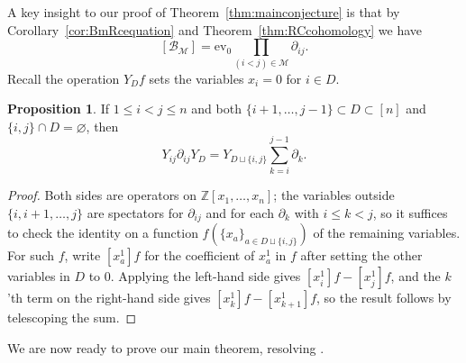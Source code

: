 \documentclass[11pt]{amsart}
\renewcommand{\emptyset}{\varnothing}
\theoremstyle{definition}
\newtheorem{prop}[thm]{Proposition}
\numberwithin{equation}{section}
\newcommand{\ct}{\operatorname{ev_0}} %
\begin{document}
A key insight to our proof of Theorem~\ref{thm:mainconjecture} is that by Corollary~\ref{cor:BmRcequation} and Theorem~\ref{thm:RCcohomology}
we have
\begin{equation}
\label{eqn:BMispartijprod}
[\mathcal{B}_\mathcal{M}]=\ct\prod_{(i<j)\in \mathcal{M}}\partial_{ij}.
\end{equation}
Recall the operation $Y_Df$ sets the variables $x_i=0$ for $i\in D$.
\begin{prop}
\label{prop:YdelY}
If $1\le i<j\le n$ and both $\{i+1,\ldots,j-1\}\subset D\subset [n]$ and $\{i,j\}\cap D=\emptyset$, then
$$Y_{ij}\partial_{ij}Y_{D}=Y_{D\sqcup \{i,j\}}\sum_{k=i}^{j-1}\partial_k.$$
\end{prop}
\begin{proof}
    Both sides are operators on $\mathbb{Z}[x_1,\dots,x_n]$; the variables outside $\{i,i+1,\dots,j\}$ are spectators for $\partial_{ij}$ and for each $\partial_k$ with $i\le k<j$, so it suffices to check the identity on a function $f(\{x_a\}_{a\in D\sqcup \{i,j\}})$ of the remaining variables. For such $f$, write $[x_a^1]f$ for the coefficient of $x_a^1$ in $f$ after setting the other variables in $D$ to $0$. Applying the left-hand side gives $[x_i^1]f-[x_j^1]f$, and the $k$'th term on the right-hand side gives $[x_k^1]f-[x_{k+1}^1]f$, so the result follows by telescoping the sum.
\end{proof}
We are now ready to prove our main theorem, resolving \cite[Conjecture 2]{sabandoalvarez2026idealsdefiningcomponentstworow}.
\end{document}
